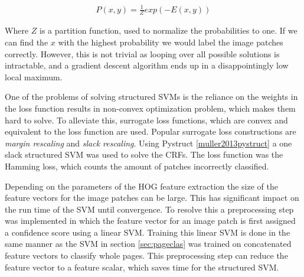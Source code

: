 \begin{align}
P(x, y) = \frac{1}{Z} exp(-E(x, y))
\end{align}

Where $Z$ is a partition function, used to normalize the probabilities to one.
If we can find the $x$ with the highest probability we would label
the image patches correctly. However, this is not trivial as
looping over all possible solutions is intractable, and a gradient descent
algorithm ends up in a disappointingly low local maximum\cite{bishop2006pattern}.

One of the problems of solving structured SVMs is the reliance on the
weights in the loss function results in non-convex optimization problem,
which makes them hard to solve. To alleviate this, surrogate loss
functions, which are convex and equivalent to the loss function are
used. Popular surrogate loss constructions are \emph{margin rescaling} and
\emph{slack rescaling}. Using Pystruct \ref{muller2013pystruct} a one slack
structured SVM was used \cite{joachims2009cutting} to solve the CRFs. The loss
function was the Hamming loss, which counts the amount of patches incorrectly
classified.

Depending on the parameters of the HOG feature extraction the size of the
feature vectors for the image patches can be large. This has significant impact
on the run time of the SVM until convergence. To resolve this a preprocessing
step was implemented in which the feature vector for an image patch is first
assigned a confidence score using a linear SVM. Training this linear SVM is done
in the same manner as the SVM in section \ref{sec:pageclas} was trained on
concatenated feature vectors to classify whole pages. This preprocessing step
can reduce the feature vector to a feature scalar, which saves time for the
structured SVM.


